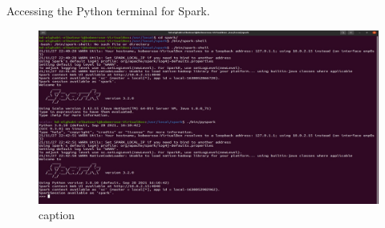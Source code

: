 \begin{spacing}{1.2}
\par Accessing the Python terminal for Spark.
\\
\begin{figure}[!htb] 
\begin{center} 
\includegraphics[width=1\linewidth]{Big_Data/Spark/Spark Installation & Configuration/spark-shell & pyspark.jpg} 
\end{center} 
\caption{caption} 
\end{figure} 
\FloatBarrier



\end{spacing}